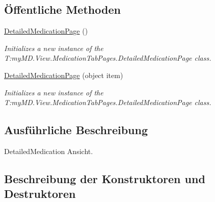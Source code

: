 \subsection*{Öffentliche Methoden}
\begin{DoxyCompactItemize}
\item 
\mbox{\hyperlink{classmy_m_d_1_1_view_1_1_medication_tab_pages_1_1_detailed_medication_page_ad79a81b82b91b290f8e80534849eab79}{Detailed\+Medication\+Page}} ()
\begin{DoxyCompactList}\small\item\em Initializes a new instance of the T\+:my\+M\+D.\+View.\+Medication\+Tab\+Pages.\+Detailed\+Medication\+Page class. \end{DoxyCompactList}\item 
\mbox{\hyperlink{classmy_m_d_1_1_view_1_1_medication_tab_pages_1_1_detailed_medication_page_a85fb3c6227ab81ef9b263263d76726b9}{Detailed\+Medication\+Page}} (object item)
\begin{DoxyCompactList}\small\item\em Initializes a new instance of the T\+:my\+M\+D.\+View.\+Medication\+Tab\+Pages.\+Detailed\+Medication\+Page class. \end{DoxyCompactList}\end{DoxyCompactItemize}


\subsection{Ausführliche Beschreibung}
Detailed\+Medication Ansicht. 



\subsection{Beschreibung der Konstruktoren und Destruktoren}
\mbox{\label{classmy_m_d_1_1_view_1_1_medication_tab_pages_1_1_detailed_medication_page_ad79a81b82b91b290f8e80534849eab79}} 

